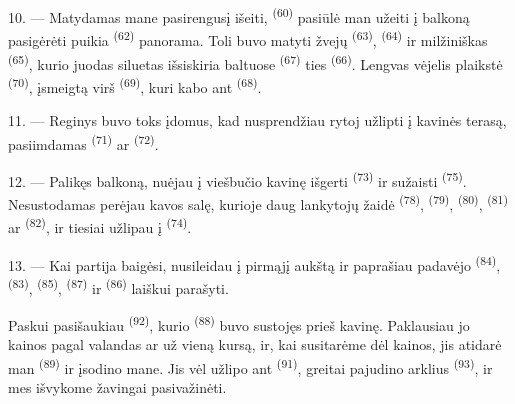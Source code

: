 10. --- Matydamas mane pasirengusį išeiti,  \textsuperscript{(60)}
pasiūlė man užeiti į balkoną pasigėrėti puikia 
\textsuperscript{(62)} panorama. Toli buvo matyti žvejų 
\textsuperscript{(63)},  \textsuperscript{(64)} ir milžiniškas
 \textsuperscript{(65)}, kurio juodas siluetas išsiskiria
baltuose  \textsuperscript{(67)} ties 
\textsuperscript{(66)}. Lengvas vėjelis plaikstė 
\textsuperscript{(70)}, įsmeigtą virš  \textsuperscript{(69)}, kuri
kabo ant  \textsuperscript{(68)}.

\VUsaut{3.0mm}
\VUsaut{3.0mm}

11. --- Reginys buvo toks įdomus, kad nusprendžiau rytoj užlipti į kavinės terasą,
pasiimdamas  \textsuperscript{(71)} ar 
\textsuperscript{(72)}.

12. --- Palikęs balkoną, nuėjau į viešbučio kavinę išgerti 
\textsuperscript{(73)} ir sužaisti  \textsuperscript{(75)}.
Nesustodamas perėjau kavos salę, kurioje daug lankytojų žaidė 
\textsuperscript{(78)},  \textsuperscript{(79)},  \textsuperscript{(80)},  \textsuperscript{(81)} ar
 \textsuperscript{(82)}, ir tiesiai užlipau į 
\textsuperscript{(74)}.

13. --- Kai partija baigėsi, nusileidau į pirmąjį aukštą ir paprašiau padavėjo
 \textsuperscript{(84)},  \textsuperscript{(83)},
 \textsuperscript{(85)}, 
\textsuperscript{(87)} ir  \textsuperscript{(86)} laiškui parašyti.

Paskui pasišaukiau  \textsuperscript{(92)}, kurio 
\textsuperscript{(88)} buvo sustojęs prieš kavinę. Paklausiau jo kainos pagal valandas
ar už vieną kursą, ir, kai susitarėme dėl kainos, jis atidarė man  \textsuperscript{(89)} ir įsodino mane. Jis vėl užlipo ant 
\textsuperscript{(91)}, greitai pajudino arklius 
\textsuperscript{(93)}, ir mes išvykome žavingai pasivažinėti.

\VUsaut{6.0mm}
\VUfilet{22mm}

